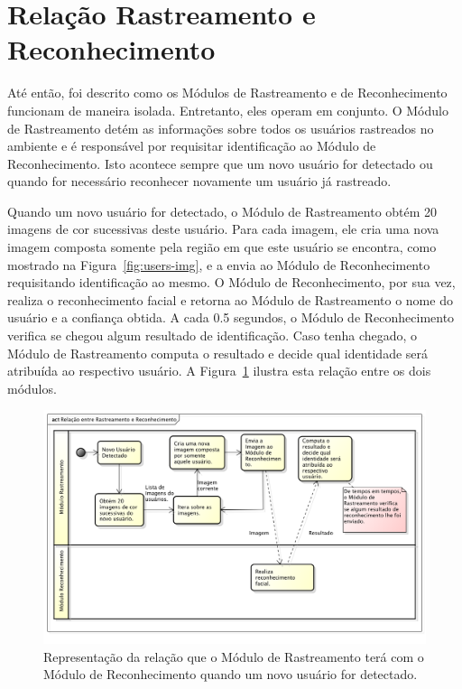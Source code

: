 \section{Relação Rastreamento e Reconhecimento}
\label{sec:rastreamento-reconhecimento}

	Até então, foi descrito como os Módulos de Rastreamento e de Reconhecimento funcionam de maneira isolada. Entretanto, eles operam em conjunto. O Módulo de Rastreamento detém as informações sobre todos os usuários rastreados no ambiente e é responsável por requisitar identificação ao Módulo de Reconhecimento. Isto acontece sempre que um novo usuário for detectado ou quando for necessário reconhecer novamente um usuário já rastreado.


	Quando um novo usuário for detectado, o Módulo de Rastreamento obtém 20 imagens de cor sucessivas deste usuário. Para cada imagem, ele cria uma nova imagem composta somente pela região em que este usuário se encontra, como mostrado na Figura~\ref{fig:users-img}, e a envia ao Módulo de Reconhecimento requisitando identificação ao mesmo. O Módulo de Reconhecimento, por sua vez, realiza o reconhecimento facial e retorna ao Módulo de Rastreamento o nome do usuário e a confiança obtida. A cada 0.5 segundos, o Módulo de Reconhecimento verifica se chegou algum resultado de identificação. Caso tenha chegado, o Módulo de Rastreamento computa o resultado e decide qual identidade será atribuída ao respectivo usuário. A Figura~\ref{fig:rastreamento-reconhecimento} ilustra esta relação entre os dois módulos.

		\begin{figure}[htb]
			\begin{center}
				\includegraphics[scale=0.5]{figuras/4.ProblemaEProposta/diagrama-relacao.png}
			\end{center}
			\caption{Representação da relação que o Módulo de Rastreamento terá com o Módulo de Reconhecimento quando um novo usuário for detectado.}
			\label{fig:rastreamento-reconhecimento}
		\end{figure}
	
